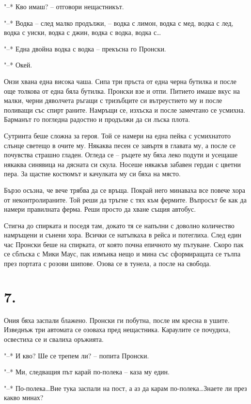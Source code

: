 \documentclass[ebook,openany,12pt]{memoir}
\begin{document}
"--* Кво имаш? – отговори нещастникът.

"--* Водка – след малко продължи, – водка с лимон, водка с мед, водка с лед, водка с уиски, водка с джин, водка с водка, водка с\ldots

"--* Една двойна водка с водка – прекъсна го Пронски.

"--* Окей.

Онзи хвана една висока чаша. Сипа три пръста от една черна бутилка и после още толкова от една бяла бутилка. Пронски взе и отпи. Питието имаше вкус на малки, черни дяволчета ръгащи с тризъбците си вътреустието му и после поливащи със спирт раните. Намръщи се, изхъска и после замечтано се усмихна. Барманът го погледна радостно и продължи да си лъска плота.

Сутринта беше сложна за героя. Той се намери на една пейка с усмихнатото слънце светещо в очите му. Някаква песен се завъртя в главата му, а после се почувства страшно гладен. Огледа се – ръцете му бяха леко подути и усещаше някаква синявица на дясната си скула. Носеше някакъв забавен гердан с цветни пера. За щастие костюмът и качулката му си бяха на място.

Бързо осъзна, че вече трябва да се връща. Покрай него минаваха все повече хора от неконтролираните. Той реши да тръгне с тях към фермите. Въпросът бе как да намери правилната ферма. Реши просто да хване същия автобус.

Стигна до спирката и поседя там, докато тя се напълни с доволно количество намръщени и сънени хора. Всички се натъпкаха в рейса и потеглиха. След един час Пронски беше на спирката, от която почна епичното му пътуване. Скоро пак се сблъска с Мики Маус, пак измънка нещо и мина със сформиращата се тълпа през портата с розови шипове. Озова се в тунела, а после на свобода.

\section*{7.}

Ония бяха заспали блажено. Пронски ги побутна, после им кресна в ушите. Изведнъж три автомата се озоваха пред нещастника. Караулите се почудиха, освестиха се и свалиха оръжията.

"--* И кво? Ше се трепем ли? – попита Пронски.

"--* Ми, следващия път карай по-полека – каза му един.

"--* По-полека\ldots Вие тука заспали на пост, а аз да карам по-полека\ldots Знаете ли през какво минах?
\end{document}
